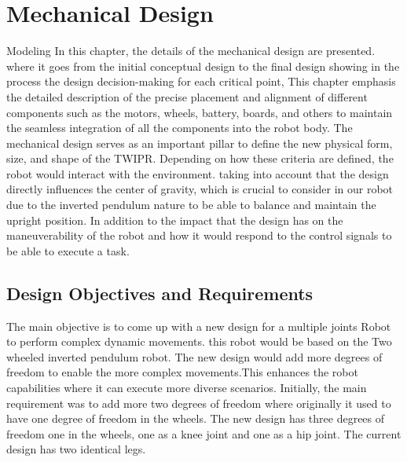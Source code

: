 \chapter{Mechanical Design}

\graphicspath{{./Figures/Mechanical Design/}}



	

 Modeling In this chapter, the details of the mechanical design are presented. where it goes from the initial conceptual design to the final design showing in the process the design decision-making for each critical point, This chapter emphasis the detailed description of the precise placement and alignment of different components such as the motors, wheels, battery, boards, and others to maintain the seamless integration of all the components into the robot body.
\newline
The mechanical design serves as an important pillar to define the new physical form, size, and shape of the TWIPR. Depending on how these criteria are defined, the robot would interact with the environment. taking into account that the design directly influences the center of gravity, which is crucial to consider in our robot due to the inverted pendulum nature to be able to balance and maintain the upright position. In addition to the impact that the design has on the maneuverability of the robot and how it would respond to the control signals to be able to execute a task.

\newpage


\section{Design Objectives and Requirements}

	The main objective is to come up with a new design for a multiple joints Robot to perform complex dynamic movements. this robot would be based on the Two wheeled inverted pendulum robot. The new design would add more degrees of freedom to enable the more complex movements.This enhances the robot capabilities where it can execute more diverse scenarios. 
	Initially, the main requirement was to add more two degrees of freedom where originally it used to have one degree of freedom in the wheels. The new design has three degrees of freedom one in the wheels, one as a knee joint and one as a hip joint. The current design has two identical legs.

